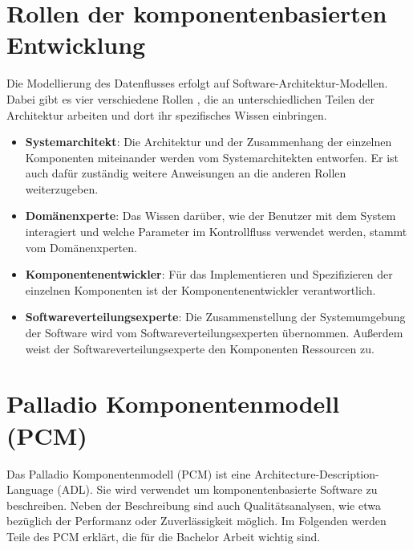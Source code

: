 \section{Rollen der komponentenbasierten Entwicklung} \label{sec:rolls}
Die Modellierung des Datenflusses erfolgt auf Software-Architektur-Modellen. Dabei gibt es vier verschiedene Rollen \cite{Koziolek2006}, die an unterschiedlichen Teilen der Architektur arbeiten und dort ihr spezifisches Wissen einbringen.
\begin{itemize}

\item \textbf{Systemarchitekt}: Die Architektur und der Zusammenhang der einzelnen Komponenten miteinander werden vom Systemarchitekten entworfen. Er ist auch dafür zuständig weitere Anweisungen an die anderen Rollen weiterzugeben.
\item \textbf{Domänenxperte}: Das Wissen darüber, wie der Benutzer mit dem System interagiert und welche Parameter im Kontrollfluss verwendet werden, stammt vom Domänenxperten.
\item \textbf{Komponentenentwickler}: Für das Implementieren und Spezifizieren der einzelnen Komponenten ist der Komponentenentwickler verantwortlich.
\item \textbf{Softwareverteilungsexperte}: Die Zusammenstellung der Systemumgebung der Software wird vom Softwareverteilungsexperten übernommen. Außerdem weist der Softwareverteilungsexperte den Komponenten Ressourcen zu.

\end{itemize}

\section{Palladio Komponentenmodell (PCM)}
Das Palladio Komponentenmodell (PCM) \cite{Becker2010} ist eine Architecture-Description-Language (ADL). Sie wird verwendet um komponentenbasierte Software zu beschreiben. Neben der Beschreibung sind auch Qualitätsanalysen, wie etwa bezüglich der Performanz oder Zuverlässigkeit möglich. Im Folgenden werden Teile des PCM erklärt, die für die Bachelor Arbeit wichtig sind.

